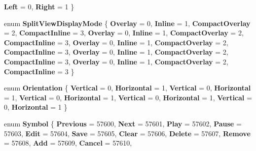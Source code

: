 \begin{DoxyCompactItemize}
{\bfseries Left} = 0, 
{\bfseries Right} = 1
 \}
\item 
\mbox{\label{namespace_windows_1_1_u_i_1_1_xaml_1_1_controls_a027ad5600573e78453a72cce427da307}} 
enum {\bfseries Split\+View\+Display\+Mode} \{ \newline
{\bfseries Overlay} = 0, 
{\bfseries Inline} = 1, 
{\bfseries Compact\+Overlay} = 2, 
{\bfseries Compact\+Inline} = 3, 
\newline
{\bfseries Overlay} = 0, 
{\bfseries Inline} = 1, 
{\bfseries Compact\+Overlay} = 2, 
{\bfseries Compact\+Inline} = 3, 
\newline
{\bfseries Overlay} = 0, 
{\bfseries Inline} = 1, 
{\bfseries Compact\+Overlay} = 2, 
{\bfseries Compact\+Inline} = 3, 
\newline
{\bfseries Overlay} = 0, 
{\bfseries Inline} = 1, 
{\bfseries Compact\+Overlay} = 2, 
{\bfseries Compact\+Inline} = 3, 
\newline
{\bfseries Overlay} = 0, 
{\bfseries Inline} = 1, 
{\bfseries Compact\+Overlay} = 2, 
{\bfseries Compact\+Inline} = 3
 \}
\item 
\mbox{\label{namespace_windows_1_1_u_i_1_1_xaml_1_1_controls_a55286136757833c08ae3e37673161c2c}} 
enum {\bfseries Orientation} \{ \newline
{\bfseries Vertical} = 0, 
{\bfseries Horizontal} = 1, 
{\bfseries Vertical} = 0, 
{\bfseries Horizontal} = 1, 
\newline
{\bfseries Vertical} = 0, 
{\bfseries Horizontal} = 1, 
{\bfseries Vertical} = 0, 
{\bfseries Horizontal} = 1, 
\newline
{\bfseries Vertical} = 0, 
{\bfseries Horizontal} = 1
 \}
\item 
\mbox{\label{namespace_windows_1_1_u_i_1_1_xaml_1_1_controls_ab2786e53a8f4a8379dca4f44df7d4497}} 
enum {\bfseries Symbol} \{ \newline
{\bfseries Previous} = 57600, 
{\bfseries Next} = 57601, 
{\bfseries Play} = 57602, 
{\bfseries Pause} = 57603, 
\newline
{\bfseries Edit} = 57604, 
{\bfseries Save} = 57605, 
{\bfseries Clear} = 57606, 
{\bfseries Delete} = 57607, 
\newline
{\bfseries Remove} = 57608, 
{\bfseries Add} = 57609, 
{\bfseries Cancel} = 57610, 

\end{DoxyCompactItemize}
